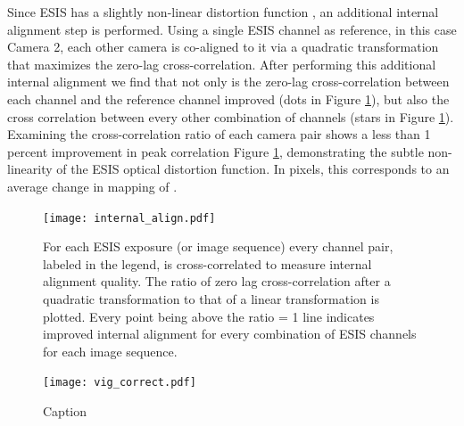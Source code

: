     	Since ESIS has a slightly non-linear distortion function \citep{ESIS}, an additional internal alignment step is performed.
    	Using a single ESIS channel as reference, in this case Camera 2, each other camera is co-aligned to it via a quadratic transformation that maximizes the zero-lag cross-correlation. 
    	After performing this additional internal alignment we find that not only is the zero-lag cross-correlation between each channel and the reference channel improved (dots in Figure \ref{fig:cc}), but also the cross correlation between every other combination of channels (stars in Figure \ref{fig:cc}).
    	Examining the cross-correlation ratio of each camera pair shows a less than 1 percent improvement in peak correlation Figure \ref{fig:cc}, demonstrating the subtle non-linearity of the ESIS optical distortion function.
    	In pixels, this corresponds to an average change in mapping of .
    	
    	\begin{figure}[htb!]
    		\centering
    		\texttt{[image: internal\_align.pdf]}
    		\caption{For each ESIS exposure (or image sequence) every channel pair, labeled in the legend, is cross-correlated to measure internal alignment quality.  The ratio of zero lag cross-correlation after a quadratic transformation to that of a linear transformation is plotted.  Every point being above the ratio = 1 line indicates improved internal alignment for every combination of ESIS channels for each image sequence.}
    		\label{fig:cc}	
    	\end{figure}
    	
 		\begin{figure}[htb!]
			\centering
			\texttt{[image: vig\_correct.pdf]}
			\caption{Caption}
			\label{fig:vig_correct}
		\end{figure}
	       	
